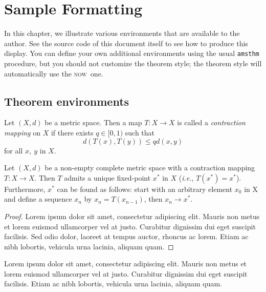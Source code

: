 \documentclass[openany]{now} %
\newcommand{\ie}{\emph{i.e.}}
\newcommand{\now}{\textsc{now}}
\begin{document}
\chapter{Sample Formatting}

In this chapter, we illustrate various environments that are available to the
author. See the source code of this document itself to see how to produce this
display. You can define your own additional environments using the
usual \texttt{amsthm} procedure, but you should not customize the theorem style;
the theorem style will automatically use the \now\ one.

\section{Theorem environments}
\label{s-theorem-envs}

\begin{definition}
    Let $(X,d)$ be a metric space. Then a map $T : X \to X$ is called a
    \emph{contraction mapping} on $X$ if there exists $q \in [0,1)$ such
    that
    \[
        d(T(x),T(y)) \leq q d(x,y)
    \]
    for all $x,~y$ in $X$.
\end{definition}

\begin{theorem}
Let $(X, d)$ be a non-empty complete metric space with a contraction mapping 
$T : X \to X$. Then $T$ admits a unique fixed-point $x^*$ in $X$ (\ie, $T(x^*) = x^*$).
Furthermore, $x^*$ can be found as follows: start with an arbitrary element $x_0$ in
X and define a sequence $x_n$ by $x_n = T(x_{n-1})$, then $x_n \to x^*$.
\end{theorem}

\begin{proof}
Lorem ipsum dolor sit amet, consectetur adipiscing elit. Mauris non metus et
lorem euismod ullamcorper vel at justo. Curabitur dignissim dui eget suscipit
facilisis. Sed odio dolor, laoreet at tempus auctor, rhoncus ac lorem. Etiam ac
nibh lobortis, vehicula urna lacinia, aliquam quam.
\end{proof}

\begin{lemma}
Lorem ipsum dolor sit amet, consectetur adipiscing elit. Mauris non metus et
lorem euismod ullamcorper vel at justo. Curabitur dignissim dui eget suscipit
facilisis. Etiam ac nibh lobortis, vehicula urna lacinia, aliquam quam.
\end{lemma}
\end{document}

